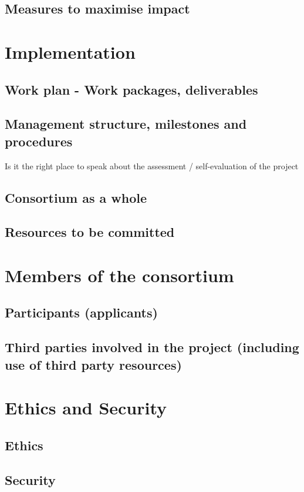 \documentclass[12pt]{book}
\begin{document}


\section{Measures to maximise impact}

\chapter{Implementation}

\section{Work plan - Work packages, deliverables}



\section{Management structure, milestones and procedures}

{\color{red} Is it the right place to speak about the assessment /
  self-evaluation of the project}


 
\section{Consortium as a whole}

\section{Resources to be committed}

\chapter{Members of the consortium}

\section{Participants (applicants)}



\section{Third parties involved in the project (including use of third party resources)}


\chapter{Ethics and Security}

\section{Ethics}

\section{Security}








\end{document}
